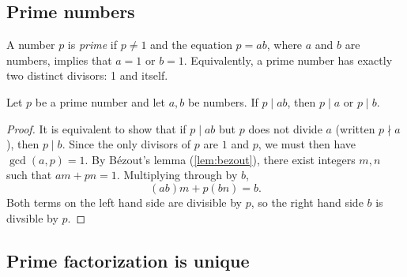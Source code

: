 \subsection{Prime numbers}

A number $p$ is \emph{prime} if $p\neq 1$ and the equation $p = ab$, where $a$ and $b$ are numbers, implies that $a = 1$ or $b = 1$. Equivalently, a prime number has exactly two distinct divisors: 1 and itself.

\begin{proposition}\label{prop:prime}
Let $p$ be a prime number and let $a,b$ be numbers. If $p\mid ab$, then $p\mid a$ or $p\mid b$.
\end{proposition}
\begin{proof}
It is equivalent to show that if $p\mid ab$ but $p$ does not divide $a$ (written $p\nmid a$), then $p\mid b$. Since the only divisors of $p$ are $1$ and $p$, we must then have $\gcd(a,p) = 1$. By B\'{e}zout's lemma (\ref{lem:bezout}), there exist integers $m,n$ such that $am + pn = 1$. Multiplying through by $b$,
\begin{equation*}
(ab)m + p(bn) = b.
\end{equation*}
Both terms on the left hand side are divisible by $p$, so the right hand side $b$ is divsible by $p$.
\end{proof}




\subsection{Prime factorization is unique}